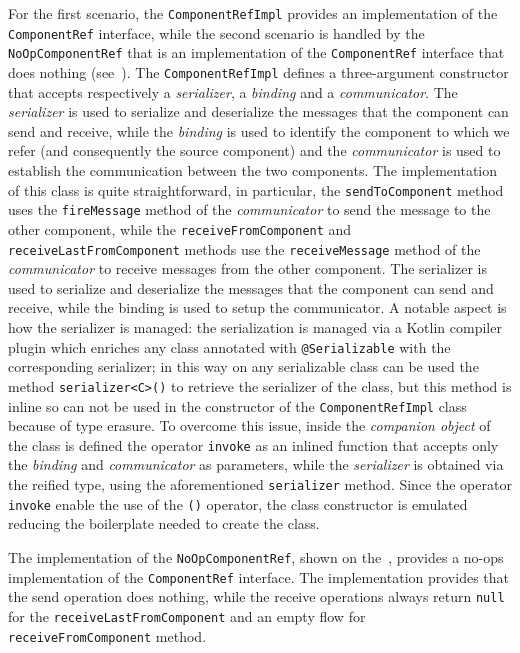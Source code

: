 For the first scenario, the \texttt{ComponentRefImpl} provides an implementation of the \texttt{ComponentRef} interface, while the second scenario is
handled by the \texttt{NoOpComponentRef} that is an implementation of the \texttt{ComponentRef} interface that does nothing
(see~).
The \texttt{ComponentRefImpl} defines a three-argument constructor that accepts respectively a \emph{serializer}, a \emph{binding} and a
\emph{communicator}. The \emph{serializer} is used to serialize and deserialize the messages that the component can send and receive, while the
\emph{binding} is used to identify the component to which we refer (and consequently the source component) and the \emph{communicator} is used to
establish the communication between the two components.
The implementation of this class is quite straightforward, in particular, the \texttt{sendToComponent} method uses the \texttt{fireMessage} method of
the \emph{communicator} to send the message to the other component, while the \texttt{receiveFromComponent} and \texttt{receiveLastFromComponent}
methods use the \texttt{receiveMessage} method of the \emph{communicator} to receive messages from the other component.
The serializer is used to serialize and deserialize the messages that the component can send and receive, while the binding is used to
setup the communicator.
A notable aspect is how the serializer is managed: the serialization is managed via a Kotlin compiler plugin which enriches any class annotated with
\texttt{@Serializable} with the corresponding serializer; in this way on any serializable class can be used the method \texttt{serializer<C>()} to
retrieve the serializer of the class, but this method is inline so can not be used in the constructor of the \texttt{ComponentRefImpl} class because of
type erasure.
To overcome this issue, inside the \emph{companion object} of the class is defined the operator \texttt{invoke} as an inlined function that
accepts only the \emph{binding} and \emph{communicator} as parameters, while the \emph{serializer} is obtained via the reified type, using the
aforementioned \texttt{serializer} method. Since the operator \texttt{invoke} enable the use of the \texttt{()} operator, the class constructor is
emulated reducing the boilerplate needed to create the class.



The implementation of the \texttt{NoOpComponentRef}, shown on the~, provides a no-ops implementation of the
\texttt{ComponentRef} interface. The implementation provides that the send operation does nothing, while the receive operations always return
\texttt{null} for the \texttt{receiveLastFromComponent} and an empty flow for \texttt{receiveFromComponent} method.

